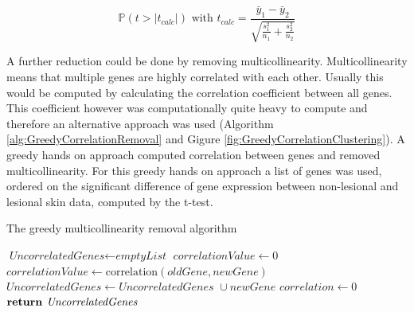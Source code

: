 \documentclass[10pt,a4paper]{article}
\begin{document}
	\begin{equation}
	\label{eq:UnequalVarianceTTest}
	\mathbb{P}(t >|t_{calc}|) \text { with } t_{calc} = \frac{\bar{y}_1 - 
		\bar{y}_2}{\sqrt{\frac{s^2_1}{n_1} + \frac{s^2_2}{n_2}}} 
	\end{equation}
	
	A further reduction could be done by removing multicollinearity. Multicollinearity means that multiple genes are highly correlated with each other. Usually this would be computed by calculating the correlation coefficient between all genes. This coefficient however was computationally quite heavy to compute and therefore an alternative approach was used (Algorithm \ref{alg:GreedyCorrelationRemoval} and Gigure \ref{fig:GreedyCorrelationClustering}). A greedy hands on approach computed correlation between genes and removed multicollinearity. For this greedy hands on approach a list of genes was used, ordered on the significant difference of gene expression between non-lesional and lesional skin data, computed by the t-test.

	\begin{algorithm}[H]
			\caption{The greedy multicollinearity removal algorithm}\label{alg:GreedyCorrelationRemoval}
			\begin{algorithmic}[1]
				\State $\textit{UncorrelatedGenes} \gets \textit{emptyList}$
				\State $\textit{correlationValue} \gets 0$
				\State $\textit{correlationValue} \gets \text{correlation}(\textit{oldGene}, newGene)$
				\EndIf
				\EndFor
				\State $\textit{UncorrelatedGenes} \gets \textit{UncorrelatedGenes } \cup newGene$
				\EndIf
				\State $\textit{correlation} \gets 0$
				\EndFor
				\State $\textbf{return } \emph{UncorrelatedGenes}$
				\EndProcedure
			\end{algorithmic}
	\end{algorithm}
\end{document}

